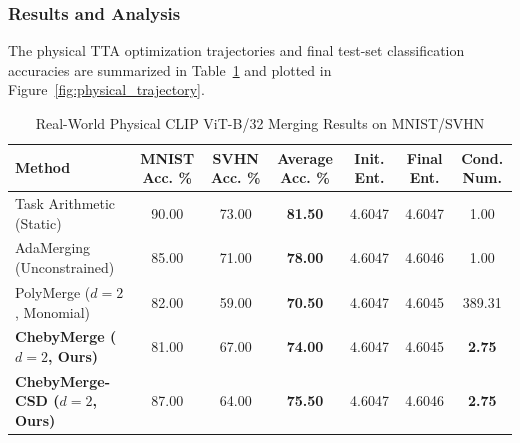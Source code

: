 \subsubsection{Results and Analysis}
The physical TTA optimization trajectories and final test-set classification accuracies are summarized in Table~\ref{tab:physical_results} and plotted in Figure~\ref{fig:physical_trajectory}.

\begin{table}[t]
\caption{Real-World Physical CLIP ViT-B/32 Merging Results on MNIST/SVHN}
\label{tab:physical_results}
\vskip 0.15in
\begin{center}
\begin{small}
\setlength{\tabcolsep}{3.0pt}
\begin{tabular}{lcccccc}
\toprule
Method & MNIST Acc. \% & SVHN Acc. \% & \textbf{Average Acc. \%} & Init. Ent. & Final Ent. & Cond. Num. \\
\midrule
Task Arithmetic (Static) & 90.00 & 73.00 & \textbf{81.50} & 4.6047 & 4.6047 & 1.00 \\
AdaMerging (Unconstrained) & 85.00 & 71.00 & \textbf{78.00} & 4.6047 & 4.6046 & 1.00 \\
PolyMerge ($d=2$, Monomial) & 82.00 & 59.00 & \textbf{70.50} & 4.6047 & 4.6045 & 389.31 \\
\midrule
\textbf{ChebyMerge ($d=2$, Ours)} & 81.00 & 67.00 & \textbf{74.00} & 4.6047 & 4.6045 & \textbf{2.75} \\
\textbf{ChebyMerge-CSD ($d=2$, Ours)} & 87.00 & 64.00 & \textbf{75.50} & 4.6047 & 4.6046 & \textbf{2.75} \\
\bottomrule
\end{tabular}
\end{small}
\end{center}
\vskip -0.1in
\end{table}

